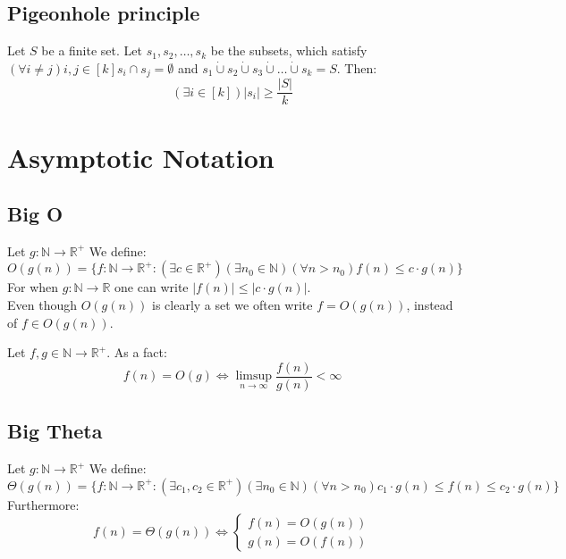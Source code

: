 \documentclass{article}
\newenvironment{definition}[1]{%
    \trivlist
    \item[\hskip\labelsep\textbf{Definition. #1.}]
    \ignorespaces
}{%
    \endtrivlist
}
\newenvironment{fact}[1]{%
    \trivlist
    \item[\hskip\labelsep\textbf{Fact. #1.}]
    \ignorespaces
}{%
    \endtrivlist
}
\begin{document}
\subsection{Pigeonhole principle}

\begin{definition}{Pigeonhole principle}
    Let $S$ be a finite set. Let $s_1, s_2, \dots, s_k$ be the subsets, which satisfy $\left(\forall i\neq j\right) i,j\in[k] s_i \cap s_j = \emptyset$ and $s_1 \dot\cup s_2 \dot\cup s_3 \dot\cup \dots \dot\cup s_k = S$. Then:
    \[\left(\exists i\in[k]\right) |s_i| \geq \frac{|S|}{k} \]
\end{definition}

\section{Asymptotic Notation}

\subsection{Big O}

\begin{definition}{Big O Asymptotic Notation}
    Let $g: \mathbb{N}\rightarrow \mathbb{R}^{+}$ We define:
    \[O\left(g(n)\right) = \{f:\mathbb{N}\rightarrow \mathbb{R}^{+} : \left(\exists c\in\mathbb{R}^{+}\right) \left(\exists n_0\in\mathbb{N}\right) \left(\forall n>n_0\right) f(n) \leq c\cdot g(n)\}\]
    For when $g: \mathbb{N}\rightarrow \mathbb{R}$ one can write $|f(n)| \leq |c\cdot g(n)|$.\\
    Even though $O(g(n))$ is clearly a set we often write $f=O(g(n))$, instead of $f\in O(g(n))$.
\end{definition}

\begin{fact}{Big O Limit}
    Let $f,g \in\mathbb{N}\rightarrow\mathbb{R}^{+}$. As a fact:
    \[f(n)=O(g) \iff \limsup_{n\rightarrow\infty} \frac{f(n)}{g(n)} < \infty\]
\end{fact}

\subsection{Big Theta}

\begin{definition}{Big Theta Asymptotic Notation}
    Let $g: \mathbb{N}\rightarrow \mathbb{R}^{+}$ We define:
    \[\Theta\left(g(n)\right) = \{f:\mathbb{N}\rightarrow \mathbb{R}^{+} : \left(\exists c_1, c_2\in\mathbb{R}^{+}\right) \left(\exists n_0\in\mathbb{N}\right) \left(\forall n>n_0\right) c_1\cdot g(n) \leq f(n) \leq c_2\cdot g(n)\}\]
    Furthermore:
    \[f(n)=\Theta(g(n)) \iff 
    \begin{cases} 
        f(n) = O(g(n))\\
        g(n) = O(f(n))
    \end{cases}
    \]
\end{definition}
\end{document}
